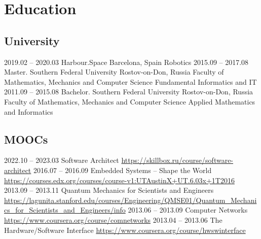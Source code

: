 \documentclass[11pt,a4paper]{moderncv}
\newcommand{\EngRus}[2]{#1}
\newcommand{\BirthPlaceOfValour}{\EngRus{Rostov-on-Don, Russia}{Ростов-на-Дону, Россия}}
\newcommand{\SunshinePalace}{\EngRus{Barcelona, Spain}{Барселона, Испания}}
\newcommand{\WorkDate}[4]{\small{\EngRus{#2.#1 -- #4.#3}{#1.#2 -- #3.#4}}}
\begin{document}
\section{\EngRus{Education}{Образование}}
\subsection{\EngRus{University}{Университет}}
\cventry
{\WorkDate{02}{2019}{03}{2020}}
{\EngRus{Harbour.Space}{Harbour.Space}}
{\SunshinePalace}
{}
{\EngRus{Robotics}{Робототехника}}
{}
\cventry
{\WorkDate{09}{2015}{08}{2017}}
{\EngRus{Master. Southern Federal University}{Магистратура. Южный Федеральный Университет}}
{\BirthPlaceOfValour}
{\EngRus{Faculty of Mathematics, Mechanics and Computer Science}
  {Институт математики, механики и компьютерных наук им. И.И. Воровича}}
{\EngRus{Fundamental Informatics and IT}{Фундаментальная информатика и информационные технологии}}
{}
\cventry
{\WorkDate{09}{2011}{08}{2015}}
{\EngRus{Bachelor. Southern Federal University}{Бакалавриат. Южный Федеральный Университет}}
{\BirthPlaceOfValour}
{\EngRus{Faculty of Mathematics, Mechanics and Computer Science}
  {Институт математики, механики и компьютерных наук им. И.И. Воровича}}
{\EngRus{Applied Mathematics and Informatics}{Прикладная математика и информатика}}
{}
\subsection{\EngRus{MOOCs}{Онлайн курсы}}
\cventry
{\WorkDate{10}{2022}{03}{2023}}
{\EngRus{Software Architect}{Архитектор программного обеспечения}}
{\newline\url{https://skillbox.ru/course/software-architect}}
{}{}{}
\cventry
{\WorkDate{07}{2016}{09}{2016}}
{Embedded Systems -- Shape the World}
{\newline\url{https://courses.edx.org/courses/course-v1:UTAustinX+UT.6.03x+1T2016}}
{}{}{}
\cventry
{\WorkDate{09}{2013}{11}{2013}}
{Quantum Mechanics for Scientists and Engineers}
{\newline\url{https://lagunita.stanford.edu/courses/Engineering/QMSE01/Quantum_Mechanics_for_Scientists_and_Engineers/info}}
{}{}{}
\cventry
{\WorkDate{06}{2013}{09}{2013}}
{Computer Networks}
{\newline\url{https://www.coursera.org/course/comnetworks}}
{}{}{}
\cventry
{\WorkDate{04}{2013}{06}{2013}}
{The Hardware/Software Interface}
{\newline\url{https://www.coursera.org/course/hwswinterface}}
{}{}{}
\end{document}
